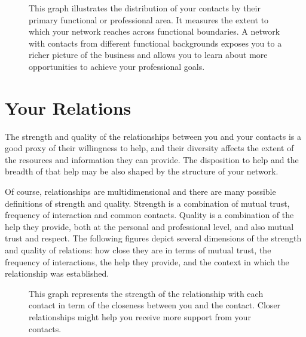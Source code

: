 \documentclass[a4paper,12pt]{article}
\begin{document}
\begin{figure}[H]
\centering
{}
\hspace{.01in}
\caption{This graph illustrates the distribution of your contacts by their primary functional or professional area. It measures the extent to which your network reaches across functional boundaries. A network with contacts from different functional backgrounds exposes you to a richer picture of the business and allows you to learn about more opportunities to achieve your professional goals.}
\end{figure}


\section*{Your Relations}


The strength and quality of the relationships between you and your contacts is a good proxy of their willingness to help, and their diversity affects the extent of the resources and information they can provide. The disposition to help and the breadth of that help may be also shaped by the structure of your network.

Of course, relationships are multidimensional and there are many possible definitions of strength and quality. Strength is a combination of mutual trust, frequency of interaction and common contacts. Quality is a combination of the help they provide, both at the personal and professional level, and also mutual trust and respect. The following figures depict several dimensions of the strength and quality of relations: how close they are in terms of mutual trust, the frequency of interactions, the help they provide, and the context in which the relationship was established.


\begin{figure}[H]
\centering
{}
\hspace{.01in}
\caption{This graph represents the strength of the relationship with each contact in term of the closeness between you and the contact. Closer relationships might help you receive more support from your contacts.}
\end{figure}
\end{document}
